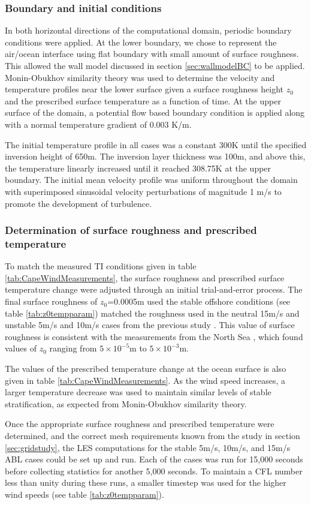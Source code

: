 \subsubsection{Boundary and initial conditions}
In both horizontal directions of the computational domain, periodic
boundary conditions were applied.  At the lower boundary, we chose to
represent the air/ocean interface using flat boundary with small
amount of surface roughness.  This allowed the wall model discussed in
section \ref{sec:wallmodelBC} to be applied.  Monin-Obukhov similarity
theory was used to determine the velocity and temperature profiles
near the lower surface given a surface roughness height $z_0$ and the
prescribed surface temperature as a function of time.  At the upper
surface of the domain, a potential flow based boundary condition is
applied along with a normal temperature gradient of 0.003 K/m.

The initial temperature profile in all cases was a constant 300K until
the specified inversion height of 650m.  The inversion layer thickness
was 100m, and above this, the temperature linearly increased until it
reached 308.75K at the upper boundary.  The initial mean velocity
profile was uniform throughout the domain with superimposed sinusoidal
velocity perturbations of magnitude 1 m/s to promote the development
of turbulence.

\subsubsection{Determination of surface roughness and prescribed temperature }
To match the measured TI conditions given in table
\ref{tab:CapeWindMeasurements}, the surface roughness and prescribed
surface temperature change were adjusted through an initial
trial-and-error process.  The final surface roughness of $z_0$=0.0005m
used the stable offshore conditions (see table \ref{tab:z0tempparam})
matched the roughness used in the neutral 15m/s and unstable 5m/s and
10m/s cases from the previous study \cite{cheung2020large}.  This
value of surface roughness is consistent with the measurements from
the North Sea \cite{taylor2001dependence}, which found values of $z_0$
ranging from $5 \times 10^{-5}$m to $5\times 10^{-3}$m.

The values of the prescribed temperature change at the ocean surface
is also given in table \ref{tab:CapeWindMeasurements}.  As the wind
speed increases, a larger temperature decrease was used to maintain
similar levels of stable stratification, as expected from
Monin-Obukhov similarity theory.

Once the appropriate surface roughness and prescribed temperature were
determined, and the correct mesh requirements known from the study in
section \ref{sec:gridstudy}, the LES computations for the stable 5m/s,
10m/s, and 15m/s ABL cases could be set up and run.  Each of the cases
was run for 15,000 seconds before collecting statistics for another
5,000 seconds.  To maintain a CFL number less than unity during these
runs, a smaller timestep was used for the higher wind speeds (see
table \ref{tab:z0tempparam}).
